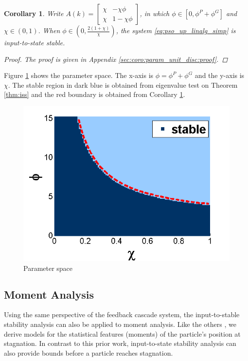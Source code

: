 \documentclass{sig-alternate}
\newtheorem{mycoro}{Corollary}
\begin{document}
\begin{mycoro}
\label{coro:param_unit_disc}
Write $ A(k) = 
\begin{bmatrix}
\chi & - \chi \phi \\
\chi & 1 - \chi \phi
\end{bmatrix}
$, in which
$ \phi \in [0,  \phi^{P} + \phi^{G} ] $ and $ \chi \in ( 0, 1 ) $.
When $ \phi \in \left( 0 , \frac{2(1+\chi)}{\chi} \right) $, the system \eqref{eq:pso_up_linalg_simp} is input-to-state stable.
\begin{proof}
The proof is given in Appendix \ref{sec:coro:param_unit_disc:proof}.
\end{proof}
\end{mycoro}

Figure \ref{fig:paramSpace} shows the parameter space.
The x-axis is $ \phi = \phi^{P} + \phi^{G} $ and the y-axis is $ \chi $.
The stable region in dark blue is obtained from eigenvalue test on Theorem \ref{thm:iss} and the red boundary is obtained from Corollary \ref{coro:param_unit_disc}.
\begin{figure}
\centering
\includegraphics[width=0.8\linewidth]{./param2.png}
\caption{Parameter space}
\label{fig:paramSpace}
\end{figure}

\subsection{Moment Analysis}
\label{sec:moment_analysis}

Using the same perspective of the feedback cascade system, the input-to-stable stability analysis can also be applied to moment analysis.
Like the others \cite{Jiang20078,Poli:2008:DSS:1384929.1384944}, we derive models for the statistical features (moments) of the particle's position at stagnation.
In contrast to this prior work,
input-to-state stability analysis can also provide bounds before a particle reaches stagnation.
\end{document}
